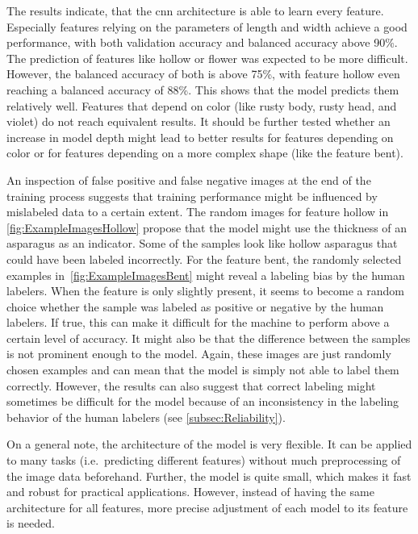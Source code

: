 \bigskip
The results indicate, that the \acrshort{cnn} architecture is able to learn every feature. Especially features relying on the parameters of length and width achieve a good performance, with both validation accuracy and balanced accuracy above 90\%. The prediction of features like hollow or flower was expected to be more difficult. However, the balanced accuracy of both is above 75\%, with feature hollow even reaching a balanced accuracy of 88\%. This shows that the model predicts them relatively well. Features that depend on color (like rusty body, rusty head, and violet) do not reach equivalent results. It should be further tested whether an increase in model depth might lead to better results for features depending on color or for features depending on a more complex shape (like the feature bent).
 
An inspection of false positive and false negative images at the end of the training process suggests that training performance might be influenced by mislabeled data to a certain extent.
The random images for feature hollow in \autoref{fig:ExampleImagesHollow} propose that the model might use the thickness of an asparagus as an indicator. Some of the samples look like hollow asparagus that could have been labeled incorrectly.
For the feature bent, the randomly selected examples in~\autoref{fig:ExampleImagesBent} might reveal a labeling bias by the human labelers. When the feature is only slightly present, it seems to become a random choice whether the sample was labeled as positive or negative by the human labelers. If true, this can make it difficult for the machine to perform above a certain level of accuracy. It might also be that the difference between the samples is not prominent enough to the model.
Again, these images are just randomly chosen examples and can mean that the model is simply not able to label them correctly. However, the results can also suggest that correct labeling might sometimes be difficult for the model because of an inconsistency in the labeling behavior of the human labelers (see \autoref{subsec:Reliability}).
 
On a general note, the architecture of the model is very flexible. It can be applied to many tasks (i.e.\ predicting different features) without much preprocessing of the image data beforehand. Further, the model is quite small, which makes it fast and robust for practical applications. However, instead of having the same architecture for all features, more precise adjustment of each model to its feature is needed.
 

